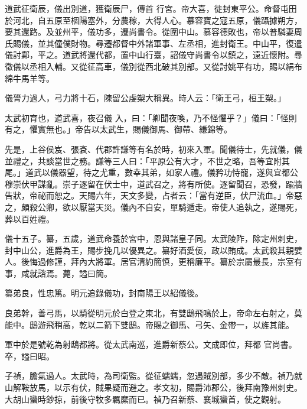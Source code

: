 \begin{pinyinscope}
 道武征衛辰，儀出別道，獲衛辰尸，傳首
 行宮。帝大喜，徙封東平公。命督屯田於河北，自五原至棝陽塞外，分農稼，大得人心。慕容寶之寇五原，儀躡據朔方，要其還路。及並州平，儀功多，遷尚書令。從圍中山。慕容德敗也，帝以普驎妻周氏賜儀，並其僮僕財物。尋遷都督中外諸軍事、左丞相，進封衛王。中山平，復遣儀討鄴，平之。道武將還代都，置中山行臺，詔儀守尚書令以鎮之，遠近懷附。尋徵儀以丞相入輔。又從征高車，儀別從西北破其別部。又從討姚平有功，賜以絹布綿牛馬羊等。



 儀膂力過人，弓力將十石，陳留公虔槊大稱異。時人云：「衛王弓，桓王槊。」



 太武初育也，道武喜，夜召儀
 入，曰：「卿聞夜喚，乃不怪懼乎？」儀曰：「怪則有之，懼實無也。」帝告以太武生，賜儀御馬、御帶、縑錦等。



 先是，上谷侯岌、張袞、代郡許謙等有名於時，初來入軍。聞儀待士，先就儀，儀並禮之，共談當世之務。謙等三人曰：「平原公有大才，不世之略，吾等宜附其尾。」道武以儀器望，待之尤重，數幸其弟，如家人禮。儀矜功恃寵，遂與宜都公穆崇伏甲謀亂。崇子逐留在伏士中，道武召之，將有所使。逐留聞召，恐發，踰牆告狀，帝祕而恕之。天賜六年，天文多變，占者云：「當有逆臣，伏尸流血。」帝惡之，頗殺公卿，欲以厭當天災。儀內不自安，單騎遁走。帝使人追執之，遂賜死，
 葬以百姓禮。



 儀十五子。纂，五歲，道武命養於宮中，恩與諸皇子同。太武陵阼，除定州刺史，封中山公，進爵為王，賜步挽几以優異之。纂好酒愛佞，政以賄成。太武殺其親嬖人。後悔過修謹，拜內大將軍。居官清約簡慎，更稱廉平。纂於宗屬最長，宗室有事，咸就諮焉。薨，謚曰簡。



 纂弟良，性忠篤。明元追錄儀功，封南陽王以紹儀後。



 良弟幹，善弓馬，以騎從明元於白登之東北，有雙鴟飛鳴於上，帝命左右射之，莫能中。鴟游飛稍高，乾以二箭下雙鴟。帝賜之御馬、弓矢、金帶一，以旌其能。



 軍中於是號乾為射鴟都將。從太武南巡，進爵新蔡公。文成即位，拜都
 官尚書。卒，謚曰昭。



 子禎，膽氣過人。太武時，為司衛監。從征蠕蠕，忽遇賊別部，多少不敵。禎乃就山解鞍放馬，以示有伏，賊果疑而避之。孝文初，賜爵沛郡公，後拜南豫州刺史。大胡山蠻時鈔掠，前後守牧多羈縻而已。禎乃召新蔡、襄城蠻首，使之觀射。




\end{pinyinscope}
